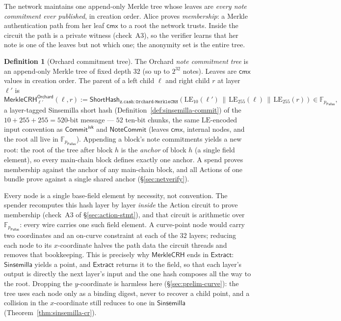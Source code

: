 \documentclass[11pt,a4paper]{article}
\theoremstyle{definition}
\newtheorem{definition}[theorem]{Definition}
\newcommand{\F}{\mathbb{F}}
\newcommand{\cmx}{\mathsf{cmx}}
\newcommand{\Pallas}{\ensuremath{\mathsf{Pallas}}}
\newcommand{\NoteCommit}{\ensuremath{\mathsf{NoteCommit}}}
\newcommand{\Sinsemilla}{\ensuremath{\mathsf{Sinsemilla}}}
\newcommand{\CommitIvk}{\ensuremath{\mathsf{Commit}^{\mathsf{ivk}}}}
\newcommand{\Extract}{\ensuremath{\mathsf{Extract}}}
\begin{document}
The network maintains one append-only Merkle tree whose leaves are
\emph{every note commitment ever published}, in creation order. Alice proves
\emph{membership}: a Merkle authentication path from her leaf $\cmx$ to a
root the network trusts. Inside the circuit the path is a private witness
(check~A3), so the verifier learns that her note is one of the leaves but not
which one; the anonymity set is the entire tree.

\begin{definition}[Orchard commitment tree]\label{def:tree}
The Orchard \emph{note commitment tree} is an append-only Merkle tree of
fixed depth $32$ (so up to $2^{32}$ notes). Leaves are $\cmx$ values in
creation order. The parent of a left child $\ell$ and right child $r$ at
layer $\ell'$ is
\[
\mathsf{MerkleCRH}^{\mathsf{Orchard}}_{\ell'}(\ell, r) := \mathsf{ShortHash}_{\mathtt{z.cash:Orchard\text{-}MerkleCRH}}(\mathrm{LE}_{10}(\ell') \,\|\, \mathrm{LE}_{255}(\ell) \,\|\, \mathrm{LE}_{255}(r)) \in \F_{p_{\Pallas}},
\]
a layer-tagged Sinsemilla short hash (Definition~\ref{def:sinsemilla-commit})
of the $10 + 255 + 255 = 520$-bit message --- $52$ ten-bit chunks, the same
$\mathrm{LE}$-encoded input convention as $\CommitIvk$ and $\NoteCommit$
(leaves $\cmx$, internal nodes, and the root all live in $\F_{p_{\Pallas}}$).
Appending a block's note commitments yields a new root: the root of the tree
after block $h$ is the \emph{anchor} of block $h$ (a single field element),
so every main-chain block defines exactly one anchor. A spend proves
membership against the anchor of any main-chain block, and all Actions of one
bundle prove against a single shared anchor (\S\ref{sec:netverify}).
\end{definition}

Every node is a single base-field element by necessity, not convention. The
spender recomputes this hash layer by layer \emph{inside} the Action circuit to
prove membership (check~A3 of \S\ref{sec:action-stmt}), and that circuit is
arithmetic over $\F_{p_{\Pallas}}$: every wire carries one such field element.
A curve-point node would carry two coordinates and an on-curve constraint at
each of the $32$ layers; reducing each node to its $x$-coordinate halves the
path data the circuit threads and removes that bookkeeping. This is precisely
why $\mathsf{MerkleCRH}$ ends in $\Extract$: $\Sinsemilla$ yields a point, and
$\Extract$ returns it to the field, so that each layer's output is directly the
next layer's input and the one hash composes all the way to the root. Dropping
the $y$-coordinate is harmless here (\S\ref{sec:prelim-curve}): the tree uses
each node only as a binding digest, never to recover a child point, and a
collision in the $x$-coordinate still reduces to one in $\Sinsemilla$
(Theorem~\ref{thm:sinsemilla-cr}).
\end{document}
